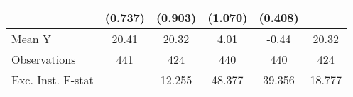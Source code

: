 {\begin{tabular}{l*{5}{c}}
            &     (0.737)         &     (0.903)         &     (1.070)         &     (0.408)         &                     \\
\midrule
Mean Y      &       20.41         &       20.32         &        4.01         &       -0.44         &       20.32         \\
Observations&         441         &         424         &         440         &         440         &         424         \\
Exc. Inst. F-stat&                     &      12.255         &      48.377         &      39.356         &      18.777         \\
\bottomrule
\end{tabular}
}
